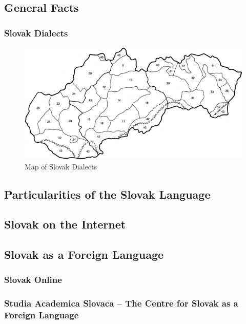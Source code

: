 \documentclass[]{../metanetpaper}
\begin{document}
\begin{multicols}{2}
\subsection{General Facts}

\subsubsection{Slovak Dialects}

\begin{figure}[ht]
\centering
\includegraphics[width=\textwidth]{dialects-map.png}
\caption{%
Map of Slovak Dialects
}
\label{fig:dialects_en}
\end{figure}


\subsection{Particularities of the Slovak Language}

\subsection{Slovak on the Internet}

\subsection{Slovak as a Foreign Language}
\subsubsection{Slovak Online}

\subsubsection{Studia Academica Slovaca -- The Centre for Slovak as a Foreign Language}


\end{multicols}
\end{document}
